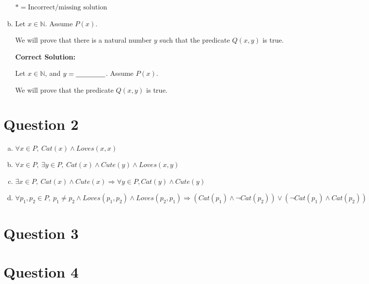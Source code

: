 \documentclass[12pt]{article}
\begin{document}
\begin{enumerate}[a.]
    $* = \text{Incorrect/missing solution}$

    \item

    Let $x \in \mathbb{N}$. Assume $P(x)$.

    \bigskip

    We will prove that there is a natural number $y$ such that the predicate
    $Q(x,y)$ is true.

    \bigskip

    \textbf{Correct Solution:}

    Let $x \in \mathbb{N}$, and $y = \underline{\hspace{1.5cm}}$. Assume $P(x)$.

    \bigskip

    We will prove that the predicate $Q(x,y)$ is true.

\end{enumerate}

\section*{Question 2}
\begin{enumerate}[a.]
    \item

    $\forall x \in P,\:Cat(x) \land Loves(x,x)$

    \item

    $\forall x \in P,\: \exists y \in P,\: Cat(x) \land Cute(y) \land Loves(x,y)$

    \item

    $\exists x \in P,\: Cat(x) \land Cute(x) \Rightarrow \forall y \in P, Cat(y)
    \land Cute(y)$

    \item

    $\forall p_1,p_2 \in P,\:p_1 \neq p_2 \land Loves(p_1,p_2) \land Loves(p_2,p_1)
    \Rightarrow (Cat(p_1) \land \neg Cat(p_2)) \lor (\neg Cat(p_1) \land Cat(p_2))$

\end{enumerate}

\section*{Question 3}

\section*{Question 4}
\end{document}
